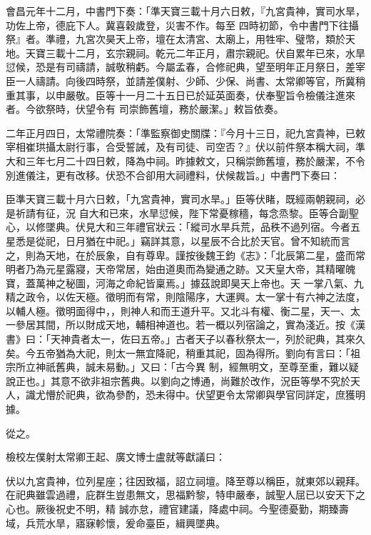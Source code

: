\begin{pinyinscope}
 會昌元年十二月，中書門下奏：「準天寶三載十月六日敕，『九宮貴神，實司水旱，功佐上帝，德庇下人。冀喜穀歲登，災害不作。每至
 四時初節，令中書門下往攝祭』者。準禮，九宮次昊天上帝，壇在太清宮、太廟上，用牲牢、璧幣，類於天地。天寶三載十二月，玄宗親祠。乾元二年正月，肅宗親祀。伏自累年已來，水旱愆候，恐是有司禱請，誠敬稍虧。今屬孟春，合修祀典，望至明年正月祭日，差宰臣一人禱請。向後四時祭，並請差僕射、少師、少保、尚書、太常卿等官，所冀稍重其事，以申嚴敬。臣等十一月二十五日已於延英面奏，伏奉聖旨令檢儀注進來者。今欲祭時，伏望令有
 司崇飾舊壇，務於嚴潔。」敕旨依奏。



 二年正月四日，太常禮院奏：「準監察御史關牒：『今月十三日，祀九宮貴神，已敕宰相崔珙攝太尉行事，合受誓誡，及有司徒、司空否？』伏以前件祭本稱大祠，準大和三年七月二十四日敕，降為中祠。昨據敕文，只稱崇飾舊壇，務於嚴潔，不令別進儀注，更有改移。伏恐不合卻用大祠禮料，伏候裁旨。」中書門下奏曰：



 臣準天寶三載十月六日敕，「九宮貴神，實司水旱。」臣等伏睹，既經兩朝親祠，必是祈請有征，況
 自大和已來，水旱愆候，陛下常憂稼穡，每念烝黎。臣等合副聖心，以修墜典。伏見大和三年禮官狀云：「縱司水旱兵荒，品秩不過列宿。今者五星悉是從祀，日月猶在中祀。」竊詳其意，以星辰不合比於天官。曾不知統而言之，則為天地，在於辰象，自有尊卑。謹按後魏王鈞《志》：「北辰第二星，盛而常明者乃為元星露寢，天帝常居，始由道奧而為變通之跡。又天皇大帝，其精曜魄寶，蓋萬神之秘圖，河海之命紀皆稟焉。」據茲說即昊天上帝也。天
 一掌八氣、九精之政令，以佐天極。徵明而有常，則陰陽序，大運興。太一掌十有六神之法度，以輔人極。徵明面得中，，則神人和而王道升平。又北斗有權、衡二星，天一、太一參居其間，所以財成天地，輔相神道也。若一概以列宿論之，實為淺近。按《漢書》曰：「天神貴者太一，佐曰五帝。」古者天子以春秋祭太一，列於祀典，其來久矣。今五帝猶為大祀，則太一無宜降祀，稍重其祀，固為得所。劉向有言曰：「祖宗所立神祇舊典，誠未易動。」又曰：「古今異
 制，經無明文，至尊至重，難以疑說正也。」其意不欲非祖宗舊典。以劉向之博通，尚難於改作，況臣等學不究於天人，識尤懵於祀典，欲為參酌，恐未得中。伏望更令太常卿與學官同詳定，庶獲明據。



 從之。



 檢校左僕射太常卿王起、廣文博士盧就等獻議曰：



 伏以九宮貴神，位列星座；往因致福，詔立祠壇。降至尊以稱臣，就東郊以親拜。在祀典雖雲過禮，庇群生豈患無文，思福黔黎，特申嚴奉，誠聖人屈已以安天下之心也。厥後祝史不明，精
 誠亦怠，禮官建議，降處中祠。今聖德憂勤，期臻壽域，兵荒水旱，寤寐軫懷，爰命臺臣，緝興墜典。




\end{pinyinscope}
